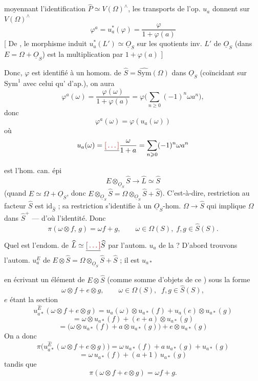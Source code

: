 \documentclass[11pt,a4paper]{article}
\begin{document}
\struck{\ill{}} moyennant l'identification
$\widehat{P} \simeq V(\Omega)^{\wedge}$, les transports de l'op. $u_a$ donnent
sur $V(\Omega)^{\wedge}$
\[
  \varphi^a = u_a^{*}(\varphi) = \frac{\varphi}{1 + \varphi(a)}
\]
[ De \struck{\ill{}}, le morphisme induit $u_a^{*}(L') \simeq \underline{O}_S$
\ill{} sur les quotients inv. $L'$ de $\underline{O}_S$ (dans
$E = \Omega + \underline{O}_S$) est la multiplication par $1 + \varphi(a)$ ]

Donc,  $\varphi$ est identifié à un homom. de
$\widehat{S} = \widehat{\mathrm{Sym}}(\Omega)$ dans $\underline{O}_S$
(coïncidant sur $\mathrm{Sym}^1$ avec celui qu'\ill{} d'ap.), on aura
\[
  \varphi^a(\omega) = \frac{\varphi(\omega)}{1 + \varphi(a)}
  = \varphi\Big( \sum_{n \geqslant 0} (-1)^n \omega a^n \Big),
\]
donc
\[
  \varphi^a(\omega) = \varphi(u_a(\omega))
\]
où
\[
  u_a(\omega) = \struck{\ill{}} \frac{\omega}{1+a}
  = \sum_{n \geqslant 0} (-1)^n \omega a^n
\]

 est l'hom. can. épi
\[
  E \otimes_{\underline{O}_S} \widehat{S} \longrightarrow \widehat{L}
  \simeq \widehat{S}
\]
(quand $E \simeq \Omega + \underline{O}_S$, donc
$E \otimes_{\underline{O}_S} \widehat{S}
= \Omega \otimes_{\underline{O}_S} \widehat{S} + \widehat{S}$).
C'est-à-dire, restriction au facteur $\widehat{S}$ est
$\mathrm{id}_{\widehat{S}}$ ; sa restriction \ill{} s'identifie à un
$\underline{O}_S$-hom. $\Omega \to \widehat{S}$ qui implique $\Omega$ dans
$\widehat{S}^{+}$ --- d'où l'identité. Donc
\[
  \pi(\omega \otimes f,\, g) = \omega f + g,
  \qquad \omega \in \Omega(S),\; f,g \in \widehat{S}(S).
\]

Quel est l'endom. de $\widehat{L} \simeq \struck{\ill{}} \widehat{S}$
 par l'autom. $u_a$ de la  ? D'abord
trouvons l'autom. $u_a^E$ de $E \otimes \widehat{S}
= \Omega \otimes_{\underline{O}_S} \widehat{S} + \widehat{S}$ ; il est
$u_{a*}$ \ill{}

en écrivant un élément de $E \otimes \widehat{S}$ (comme somme d'objets de ce
\ill{}) sous la forme
\[
  \omega \otimes f + e \otimes g,
  \qquad \omega \in \Omega(S),\;\; f,g \in \widehat{S}(S),
\]
$e$ étant la section \ill{}
\[
  u_{a*}^{\widehat{E}}(\omega \otimes f + e \otimes g)
  = u_a(\omega) \otimes u_{a*}(f) + u_a(e) \otimes u_{a*}(g)
\]
\[
  = \omega \otimes u_{a*}(f) + (e + a) \otimes u_{a*}(g)
\]
\[
  = \big( \omega \otimes u_{a*}(f) + a \otimes u_{a*}(g) \big)
  + e \otimes u_{a*}(g)
\]
On a donc
\[
  \pi\big( u_{a*}^{\widehat{E}}(\omega \otimes f + e \otimes g) \big)
  = \omega\, u_{a*}(f) + a\, u_{a*}(g) + u_{a*}(g)
\]
\[
  = \omega\, u_{a*}(f) + (a+1)\, u_{a*}(g)
\]
tandis que
\[
  \pi(\omega \otimes f + e \otimes g) = \omega f + g .
\]
\end{document}
